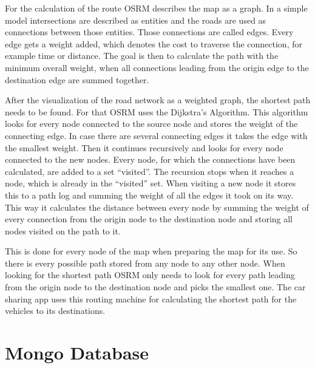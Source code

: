 
For the calculation of the route OSRM describes the map as a graph. In a simple model intersections are described as entities and the roads are used as connections between those entities. Those connections are called edges. Every edge gets a weight added, which denotes the cost to traverse the connection, for example time or distance. The goal is then to calculate the path with the minimum overall weight, when all connections leading from the origin edge to the destination edge are summed together.


After the visualization of the road network as a weighted graph, the shortest path needs to be found. For that OSRM uses the Dijkstra's Algorithm. This algorithm looks for every node connected to the source node and stores the weight of the connecting edge. In case there are several connecting edges it takes the edge with the smallest weight. Then it continues recursively and looks for every node connected to the new nodes. Every node, for which the connections have been calculated, are added to a set ``visited''. The recursion stops when it reaches a node, which is already in the ``visited'' set. When visiting a new node it stores this to a path log and summing the weight of all the edges it took on its way. This way it calculates the distance between every node by summing the weight of every connection from the origin node to the destination node and storing all nodes visited on the path to it. 


This is done for every node of the map when preparing the map for its use. So there is every possible path stored from any node to any other node. When looking for the shortest path OSRM only needs to look for every path leading from the origin node to the destination node and picks the smallest one. The car sharing app uses this routing machine for calculating the shortest path for the vehicles to its destinations.

\section{Mongo Database}

